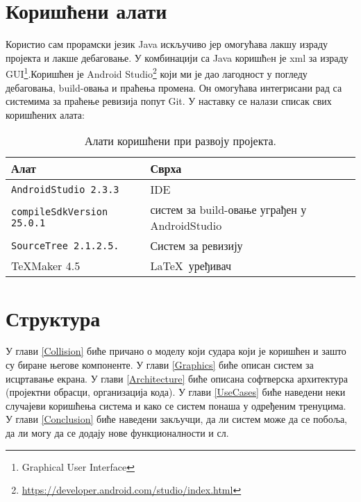 \section{Коришћени алати}
Користио сам прорамски језик Java искључиво јер омогућава лакшу израду пројекта и лакше дебаговање. У комбинацији са Java коришћeн је xml за израду GUI\footnote{Graphical User Interface}.Коришћен је Android Studio\footnote{\url{https://developer.android.com/studio/index.html}} који ми је дао лагодност у погледу дебаговања, build-овања и праћења промена. Он омогућава интегрисани рад са системима за праћење ревизија попут Git. У наставку се налази списак свих коришћених алата:
\begin{table}[H]\centering
\begin{tabular}{ l  l } \toprule
{\bf Алат} & {\bf Сврха}\\ \midrule
{\tt AndroidStudio 2.3.3} & IDE\\
{\tt compileSdkVersion 25.0.1} & систем за build-овање уграђен у AndroidStudio\\
{\tt SourceTree 2.1.2.5.} & Систем за ревизију\\
\TeX Maker 4.5 & \LaTeX\ уређивач\\
\bottomrule
\end{tabular}
\caption{Алати коришћени при развоју пројекта.} \label{UsedTools}
\end{table}


\section{Структура}
У глави  \ref{Collision} биће причано о моделу који судара који је коришћен и зашто су биране његове компоненте. У глави \ref{Graphics} биће описан систем за исцртавање екрана. У глави \ref{Architecture} биће описана софтверска архитектура (пројектни обрасци, организација кода). У глави \ref{UseCases} биће наведени неки случајеви коришћења система и како се систем понаша у одређеним тренуцима. У глави \ref{Conclusion} биће наведени закључци, да ли систем може да се побоља, да ли могу да се додају нове функционалности и сл.


	